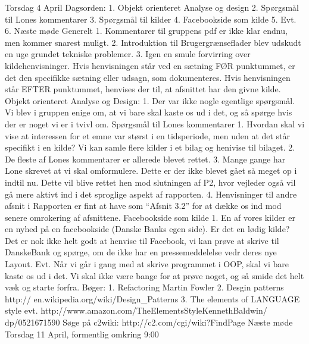 Torsdag 4 April
Dagsorden:
1. Objekt orienteret Analyse og design
2. Spørgsmål til Lones kommentarer
3. Spørgsmål til kilder
4. Facebookside som kilde
5. Evt.
6. Næste møde
Generelt
1. Kommentarer til gruppens pdf er ikke klar endnu, men kommer snarest muligt.
2. Introduktion til Brugergrænseflader blev udskudt en uge grundet tekniske problemer.
3. Igen en smule forvirring over kildehenvisninger. Hvis henvisningen står ved en sætning
FØR punktummet, er det den specifikke sætning eller udsagn, som dokumenteres. Hvis
henvisningen står EFTER punktummet, henvises der til, at afsnittet har den givne kilde.
Objekt orienteret Analyse og Design:
1. Der var ikke nogle egentlige spørgsmål. Vi blev i gruppen enige om, at vi bare skal kaste
os ud i det, og så spørge hvis der er noget vi er i tvivl om.
Spørgsmål til Lones kommentarer
1. Hvordan skal vi vise at interessen for et emne var størst i en tidsperiode, men uden at det
står specifikt i en kilde? Vi kan samle flere kilder i et bilag og henivise til bilaget.
2. De fleste af Lones kommentarer er allerede blevet rettet.
3. Mange gange har Lone skrevet at vi skal omformulere. Dette er der ikke blevet gået så
meget op i indtil nu. Dette vil blive rettet hen mod slutningen af P2, hvor vejleder også vil
gå mere aktivt ind i det sproglige aspekt af rapporten.
4. Henvisninger til andre afsnit i Rapporten er fint at have som “Afsnit 3.2” for at dække os
ind mod senere omrokering af afsnittene.
Facebookside som kilde
1. En af vores kilder er en nyhed på en facebookside
(Danske Banks egen side). Er det en
lødig kilde? Det er nok ikke helt godt at henvise til Facebook, vi kan prøve at skrive til
DanskeBank og spørge, om de ikke har en pressemeddelelse vedr deres nye Layout.
Evt.
Når vi går i gang med at skrive programmet i OOP, skal vi bare kaste os ud i det. Vi skal ikke
være bange for at prøve noget, og så smide det helt væk og starte forfra.
Bøger:
1. Refactoring Martin
Fowler
2. Desgin patterns http://
en.wikipedia.org/wiki/Design_Patterns
3. The elements of LANGUAGE style evt.
http://www.amazon.com/TheElementsStyleKennethBaldwin/
dp/0521671590
Søge på c2wiki:
http://c2.com/cgi/wiki?FindPage
Næste møde
Torsdag 11 April, formentlig omkring 9:00